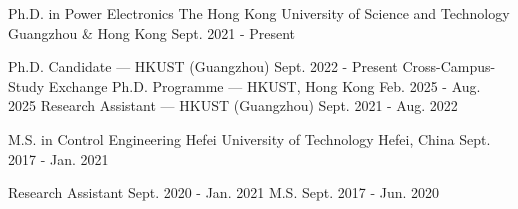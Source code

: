 

\begin{cventries}



  \cventry
    {Ph.D. in Power Electronics} %
    {The Hong Kong University of Science and Technology} %
    {Guangzhou \& Hong Kong} %
    {Sept. 2021 - Present} %
    {\vspace{-1em}
      \begin{cvsubentries}
        \cvsubentry
          {}
          {Ph.D. Candidate \textnormal{— HKUST (Guangzhou)}}
          {Sept. 2022 - Present}
          {}
        \cvsubentry
          {}
          {Cross-Campus-Study Exchange Ph.D. Programme \textnormal{— HKUST, Hong Kong}}
          {Feb. 2025 - Aug. 2025}
          {}
        \cvsubentry
          {} %
          {Research Assistant \textnormal{— HKUST (Guangzhou)}}
          {Sept. 2021 - Aug. 2022}
          {}
      \end{cvsubentries}
      \vspace{-1em}
    }



  \cventry
    {M.S. in Control Engineering} %
    {Hefei University of Technology} %
    {Hefei, China} %
    {Sept. 2017 - Jan. 2021} %
    {\vspace{-1em}
      \begin{cvsubentries}
        \cvsubentry
          {}
          {Research Assistant}
          {Sept. 2020 - Jan. 2021}
          {}
        \cvsubentry
          {}
          {M.S.}
          {Sept. 2017 - Jun. 2020}
          {}
      \end{cvsubentries}
      \vspace{-1em}
    }
    

\end{cventries}
